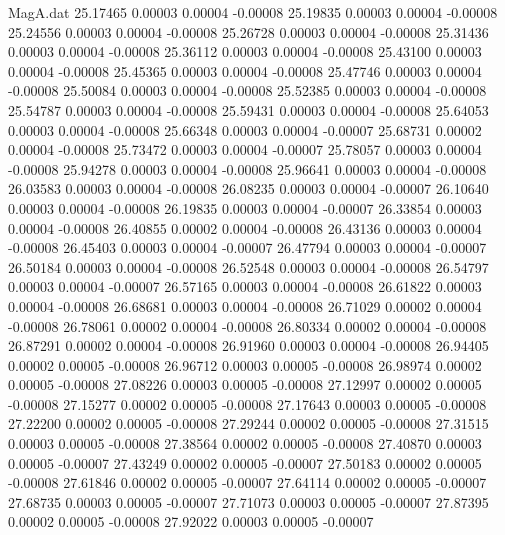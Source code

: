 \begin{filecontents}{MagA.dat}
  25.17465    0.00003    0.00004   -0.00008
  25.19835    0.00003    0.00004   -0.00008
  25.24556    0.00003    0.00004   -0.00008
  25.26728    0.00003    0.00004   -0.00008
  25.31436    0.00003    0.00004   -0.00008
  25.36112    0.00003    0.00004   -0.00008
  25.43100    0.00003    0.00004   -0.00008
  25.45365    0.00003    0.00004   -0.00008
  25.47746    0.00003    0.00004   -0.00008
  25.50084    0.00003    0.00004   -0.00008
  25.52385    0.00003    0.00004   -0.00008
  25.54787    0.00003    0.00004   -0.00008
  25.59431    0.00003    0.00004   -0.00008
  25.64053    0.00003    0.00004   -0.00008
  25.66348    0.00003    0.00004   -0.00007
  25.68731    0.00002    0.00004   -0.00008
  25.73472    0.00003    0.00004   -0.00007
  25.78057    0.00003    0.00004   -0.00008
  25.94278    0.00003    0.00004   -0.00008
  25.96641    0.00003    0.00004   -0.00008
  26.03583    0.00003    0.00004   -0.00008
  26.08235    0.00003    0.00004   -0.00007
  26.10640    0.00003    0.00004   -0.00008
  26.19835    0.00003    0.00004   -0.00007
  26.33854    0.00003    0.00004   -0.00008
  26.40855    0.00002    0.00004   -0.00008
  26.43136    0.00003    0.00004   -0.00008
  26.45403    0.00003    0.00004   -0.00007
  26.47794    0.00003    0.00004   -0.00007
  26.50184    0.00003    0.00004   -0.00008
  26.52548    0.00003    0.00004   -0.00008
  26.54797    0.00003    0.00004   -0.00007
  26.57165    0.00003    0.00004   -0.00008
  26.61822    0.00003    0.00004   -0.00008
  26.68681    0.00003    0.00004   -0.00008
  26.71029    0.00002    0.00004   -0.00008
  26.78061    0.00002    0.00004   -0.00008
  26.80334    0.00002    0.00004   -0.00008
  26.87291    0.00002    0.00004   -0.00008
  26.91960    0.00003    0.00004   -0.00008
  26.94405    0.00002    0.00005   -0.00008
  26.96712    0.00003    0.00005   -0.00008
  26.98974    0.00002    0.00005   -0.00008
  27.08226    0.00003    0.00005   -0.00008
  27.12997    0.00002    0.00005   -0.00008
  27.15277    0.00002    0.00005   -0.00008
  27.17643    0.00003    0.00005   -0.00008
  27.22200    0.00002    0.00005   -0.00008
  27.29244    0.00002    0.00005   -0.00008
  27.31515    0.00003    0.00005   -0.00008
  27.38564    0.00002    0.00005   -0.00008
  27.40870    0.00003    0.00005   -0.00007
  27.43249    0.00002    0.00005   -0.00007
  27.50183    0.00002    0.00005   -0.00008
  27.61846    0.00002    0.00005   -0.00007
  27.64114    0.00002    0.00005   -0.00007
  27.68735    0.00003    0.00005   -0.00007
  27.71073    0.00003    0.00005   -0.00007
  27.87395    0.00002    0.00005   -0.00008
  27.92022    0.00003    0.00005   -0.00007

\end{filecontents}
